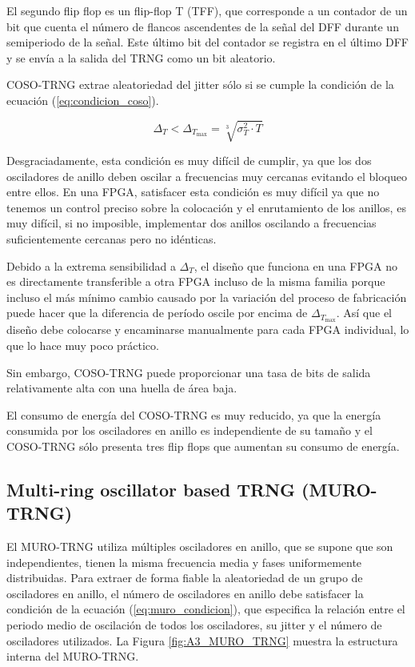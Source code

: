                 El segundo flip flop es un flip-flop T (TFF), que corresponde a un contador de un bit que cuenta el número de flancos ascendentes de la señal del DFF durante un semiperiodo de la señal. Este último bit del contador se registra en el último DFF y se envía a la salida del TRNG como un bit aleatorio.

                COSO-TRNG extrae aleatoriedad del jitter sólo si se cumple la condición de la ecuación (\ref{eq:condicion_coso}).

                \begin{equation}
                    \Delta_{T} < \Delta_{T_{\text{max}}}  = \sqrt[3]{\sigma_{T}^{2} \cdot T}
                    \label{eq:condicion_coso}
                \end{equation}
	
                Desgraciadamente, esta condición es muy difícil de cumplir, ya que los dos osciladores de anillo deben oscilar a frecuencias muy cercanas evitando el bloqueo entre ellos. En una FPGA, satisfacer esta condición es muy difícil ya que no tenemos un control preciso sobre la colocación y el enrutamiento de los anillos, es muy difícil, si no imposible, implementar dos anillos oscilando a frecuencias suficientemente cercanas pero no idénticas.

                Debido a la extrema sensibilidad a $\Delta_{T}$, el diseño que funciona en una FPGA no es directamente transferible a otra FPGA incluso de la misma familia porque incluso el más mínimo cambio causado por la variación del proceso de fabricación puede hacer que la diferencia de período oscile por encima de $\Delta_{T_{\text{max}}} $.  Así que el diseño debe colocarse y encaminarse manualmente para cada FPGA individual, lo que lo hace muy poco práctico. 

                Sin embargo, COSO-TRNG puede proporcionar una tasa de bits de salida relativamente alta con una huella de área baja.

                El consumo de energía del COSO-TRNG es muy reducido, ya que la energía consumida por los osciladores en anillo es independiente de su tamaño y el COSO-TRNG sólo presenta tres flip flops que aumentan su consumo de energía.

		\subsection{Multi-ring oscillator based TRNG (MURO-TRNG)}

            El MURO-TRNG utiliza múltiples osciladores en anillo, que se supone que son independientes, tienen la misma frecuencia media y fases uniformemente distribuidas. Para extraer de forma fiable la aleatoriedad de un grupo de osciladores en anillo, el número de osciladores en anillo debe satisfacer la condición de la ecuación (\ref{eq:muro_condicion}), que especifica la relación entre el periodo medio de oscilación de todos los osciladores, su jitter y el número de osciladores utilizados. La Figura \ref{fig:A3_MURO_TRNG} muestra la estructura interna del MURO-TRNG.

